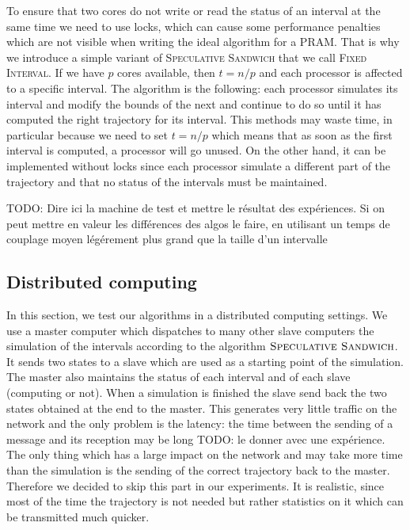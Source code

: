 \documentclass[a4paper,10pt]{article}
\newcommand{\todo}[1]{{\color{red} TODO: {#1}}}
\begin{document}
To ensure that two cores do not write or read the status of an interval at the same time we need to use locks,
which can cause some performance penalties which are not visible when writing the ideal algorithm for a PRAM.
That is why we introduce a simple variant of \textsc{Speculative Sandwich} that we call \textsc{Fixed Interval}.
If we have $p$ cores available, then $t = n/p$ and each processor is affected to a specific interval. 
The algorithm is the following:  each processor simulates its interval and modify the bounds of the next and continue to do so until it has computed the right trajectory for its interval. This methods may waste time, in particular because we need to set
$t = n/p$ which means that as soon as the first interval is computed, a processor will go unused. On the other hand, it can be 
implemented without locks since each processor simulate a different part of the trajectory and that no status of the intervals must be maintained.


\todo{Dire ici la machine de test et mettre le résultat des expériences. Si on peut mettre en valeur les différences des algos le faire, en utilisant un temps de couplage moyen légérement plus grand que la taille d'un intervalle}


\subsection{Distributed computing}

In this section, we test our algorithms in a distributed computing settings. We use a master computer which dispatches
to many other slave computers the simulation of the intervals according to the algorithm $\textsc{Speculative Sandwich}$.
It sends two states to a slave which are used as a starting point of the simulation. The master also maintains the status of each interval and of each slave (computing or not). When a simulation is finished the slave send back the two states obtained at the end 
to the master. This generates very little traffic on the network and the only problem is the latency: the time between the sending of a message and its reception may be long \todo{le donner avec une expérience}.  The only thing which has a large impact on the network and may take more time than the simulation is the sending of the correct trajectory back to the master. Therefore we decided to skip this part in our experiments. It is realistic, since most of the time the trajectory is not needed but rather statistics on it which can be transmitted much quicker. 
\end{document}
